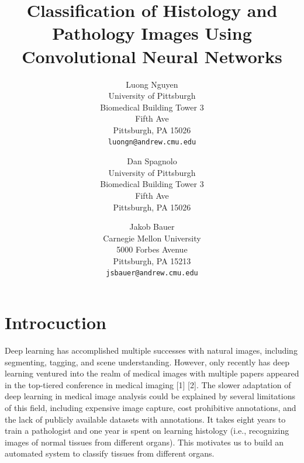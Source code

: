 \documentclass[10pt,twocolumn,letterpaper]{article}
\begin{document}
\title
{
    Classification of Histology and Pathology Images Using Convolutional Neural
    Networks%
}

\author{%
    Luong Nguyen\\
    University of Pittsburgh\\
    Biomedical Building Tower 3\\
    Fifth Ave\\
    Pittsburgh, PA 15026\\
    {\tt\small luongn@andrew.cmu.edu}
    \and
    Dan Spagnolo\\
    University of Pittsburgh\\
    Biomedical Building Tower 3\\
    Fifth Ave\\
    Pittsburgh, PA 15026\\
    \and
    Jakob Bauer\\
    Carnegie Mellon University\\
    5000 Forbes Avenue\\
    Pittsburgh, PA 15213\\
    {\tt\small jsbauer@andrew.cmu.edu}
}

\maketitle




\section{Introcuction}
\label{sec:Introcuction}

Deep learning has accomplished multiple successes with natural images,
including segmenting, tagging, and scene understanding. However, only
recently has deep learning ventured into the realm of medical images with
multiple papers appeared in the top-tiered conference in medical imaging
[1] [2]. The slower adaptation of deep learning in medical image analysis
could be explained by several limitations of this field, including expensive
image capture, cost prohibitive annotations, and the lack of publicly
available datasets with annotations. It takes eight years to train a
pathologist and one year is spent on learning histology (i.e., recognizing
images of normal tissues from different organs). This motivates us to build
an automated system to classify tissues from different organs.
\end{document}
